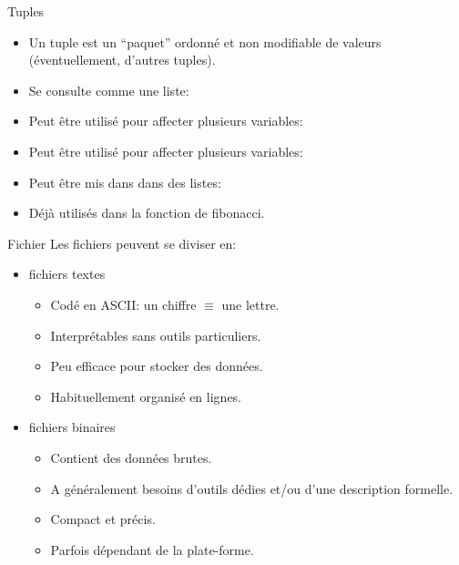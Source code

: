 \documentclass{beamer}
\begin{document}
\begin{frame}{Tuples}
  \begin{itemize}
  \item Un tuple est un ``paquet'' ordonné et non modifiable de valeurs (éventuellement, d'autres tuples).
    \newline{}
  \item Se consulte comme une liste:
    \newline{}
  \item  Peut être utilisé pour affecter plusieurs variables:
    \newline{}
  \item Peut être utilisé pour affecter plusieurs variables:
    \newline{}
  \item Peut être mis dans dans des listes:
    \newline{}
  \item Déjà utilisés dans la fonction de fibonacci.
  \end{itemize}
\end{frame}

\begin{frame}{Fichier}
  Les fichiers peuvent se diviser en:
  \begin{itemize}
    \item fichiers textes
      \begin{itemize}
      \item Codé en ASCII: un chiffre $\equiv$ une lettre.
      \item Interprétables sans outils particuliers.
      \item Peu efficace pour stocker des données.
      \item Habituellement organisé en lignes.
      \end{itemize}
    \item fichiers binaires
      \begin{itemize}
      \item Contient des données brutes.
      \item A généralement besoins d'outils dédies et/ou d'une description formelle.
      \item Compact et précis.
      \item Parfois dépendant de la plate-forme.
      \end{itemize}
  \end{itemize}
\end{frame}
\end{document}
